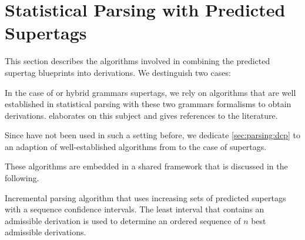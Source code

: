 \documentclass[../../document.tex]{subfiles}
\begin{document}
    \section{Statistical Parsing with Predicted Supertags}\label{sec:parsing}
    This section describes the algorithms involved in combining the predicted supertag blueprints into derivations.
    We destinguish two cases:
    \begin{inparaenum}[]
        \item In the case of  or hybrid grammars supertags, we rely on algorithms that are well established in statistical parsing with these two grammars formalisms to obtain derivations.  elaborates on this subject and gives references to the literature.
        \item Since  have not been used in such a setting before, we dedicate \cref{sec:parsing:dcp} to an adaption of well-established algorithms from  to the case of  supertags.
    \end{inparaenum}
    These algorithms are embedded in a shared framework that is discussed in the following.

    \begin{algorithm}[t]
        \caption{\label{alg:parsing:incremental}
            Incremental parsing algorithm that uses increasing sets of predicted supertags with a sequence confidence intervals.
            The least interval that contains an admissible derivation is used to determine an ordered sequence of \(n\) best admissible derivations.
        }
        
    \end{algorithm}
\end{document}
